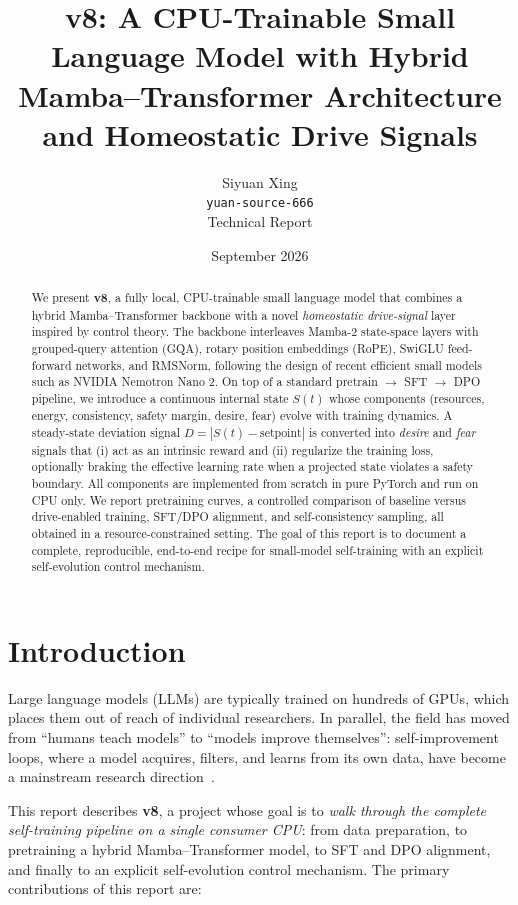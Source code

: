 \documentclass[11pt]{article}
\title{\textbf{v8: A CPU-Trainable Small Language Model with Hybrid Mamba--Transformer Architecture and Homeostatic Drive Signals}}
\author{Siyuan Xing\\
  \texttt{yuan-source-666} \\[2mm]
  {\small Technical Report}}
\date{September 2026}
\begin{document}
\maketitle

\begin{abstract}
We present \textbf{v8}, a fully local, CPU-trainable small language model that
combines a hybrid Mamba--Transformer backbone with a novel \emph{homeostatic
drive-signal} layer inspired by control theory. The backbone interleaves
Mamba-2 state-space layers with grouped-query attention (GQA), rotary position
embeddings (RoPE), SwiGLU feed-forward networks, and RMSNorm, following the
design of recent efficient small models such as NVIDIA Nemotron Nano 2. On top
of a standard pretrain $\rightarrow$ SFT $\rightarrow$ DPO pipeline, we introduce
a continuous internal state $S(t)$ whose components (resources, energy,
consistency, safety margin, desire, fear) evolve with training dynamics. A
steady-state deviation signal $D=|S(t)-\text{setpoint}|$ is converted into
\emph{desire} and \emph{fear} signals that (i) act as an intrinsic reward and
(ii) regularize the training loss, optionally braking the effective learning
rate when a projected state violates a safety boundary. All components are
implemented from scratch in pure PyTorch and run on CPU only. We report
pretraining curves, a controlled comparison of baseline versus drive-enabled
training, SFT/DPO alignment, and self-consistency sampling, all obtained in a
resource-constrained setting. The goal of this report is to document a
complete, reproducible, end-to-end recipe for small-model self-training with an
explicit self-evolution control mechanism.
\end{abstract}

\section{Introduction}
\label{sec:intro}

Large language models (LLMs) are typically trained on hundreds of GPUs, which
places them out of reach of individual researchers. In parallel, the field has
moved from ``humans teach models'' to ``models improve themselves'':
self-improvement loops, where a model acquires, filters, and learns from its own
data, have become a mainstream research direction~\cite{selfimp,selfplay}.

This report describes \textbf{v8}, a project whose goal is to \emph{walk
through the complete self-training pipeline on a single consumer CPU}: from
data preparation, to pretraining a hybrid Mamba--Transformer model, to SFT and
DPO alignment, and finally to an explicit self-evolution control mechanism. The
primary contributions of this report are:
\end{document}
